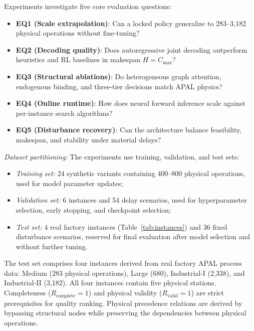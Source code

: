 \documentclass[journal,10pt]{IEEEtran}
\begin{document}
Experiments investigate five core evaluation questions:
\begin{itemize}
\item \textbf{EQ1 (Scale extrapolation)}: Can a locked policy generalize to 283--3,182 physical operations without fine-tuning?
\item \textbf{EQ2 (Decoding quality)}: Does autoregressive joint decoding outperform heuristics and RL baselines in makespan $H=C_{\max}$?
\item \textbf{EQ3 (Structural ablations)}: Do heterogeneous graph attention, endogenous binding, and three-tier decisions match APAL physics?
\item \textbf{EQ4 (Online runtime)}: How does neural forward inference scale against per-instance search algorithms?
\item \textbf{EQ5 (Disturbance recovery)}: Can the architecture balance feasibility, makespan, and stability under material delays?
\end{itemize}

\textit{Dataset partitioning:}
The experiments use training, validation, and test sets:
\begin{itemize}
    \item \textit{Training set:} 24 synthetic variants containing 400--800 physical operations, used for model parameter updates;
    \item \textit{Validation set:} 6 instances and 54 delay scenarios, used for hyperparameter selection, early stopping, and checkpoint selection;
    \item \textit{Test set:} 4 real factory instances (Table~\ref{tab:instances}) and 36 fixed disturbance scenarios, reserved for final evaluation after model selection and without further tuning.
\end{itemize}
The test set comprises four instances derived from real factory APAL process data: Medium (283 physical operations), Large (680), Industrial-I (2,338), and Industrial-II (3,182). All four instances contain five physical stations. Completeness ($R_{\mathrm{complete}}=1$) and physical validity ($R_{\mathrm{valid}}=1$) are strict prerequisites for quality ranking. Physical precedence relations are derived by bypassing structural nodes while preserving the dependencies between physical operations.
\end{document}
